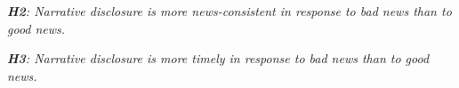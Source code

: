 \documentclass[letterpaper,11pt]{article}
\begin{document}
\begin{spacing}{1.5}
\begin{center}
	\textit{\textbf{H2}: Narrative disclosure is more news-consistent in response to bad news than to good news.\label{h2}}
\end{center}

\begin{center}
	\textit{\textbf{H3}: Narrative disclosure is more timely in response to bad news than to good news.\label{h3}}
\end{center}

\begin{comment}
\subsection{Conditional, Unconditional and Narrative Conservatism: Usefulness}

\end{comment}
\end{spacing}
\end{document}
